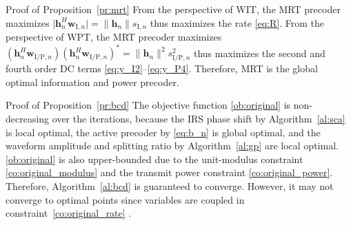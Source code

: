 \documentclass[journal]{IEEEtran}
\begin{document}
\begin{appendix}
		\begin{subsection}{Proof of Proposition~\ref{pr:mrt}}\label{ap:mrt}
			From the perspective of WIT, the MRT precoder maximizes $\lvert{\boldsymbol{h}_{n}^H \boldsymbol{w}_{\mathrm{I}, n}}\rvert = \lVert{\boldsymbol{h}_{n}}\rVert s_{\mathrm{I}, n}$ thus maximizes the rate \eqref{eq:R}. From the perspective of WPT, the MRT precoder maximizes $(\boldsymbol{h}_{n}^H \boldsymbol{w}_{\mathrm{I/P}, n})(\boldsymbol{h}_{n}^H \boldsymbol{w}_{\mathrm{I/P}, n})^* = \lVert{\boldsymbol{h}_{n}}\rVert^2 s_{\mathrm{I/P}, n}^2$ thus maximizes the second and fourth order DC terms \eqref{eq:y_I2}--\eqref{eq:y_P4}. Therefore, MRT is the global optimal information and power precoder.
		\end{subsection}

		\begin{subsection}{Proof of Proposition~\ref{pr:bcd}}\label{ap:bcd}
			The objective function \eqref{ob:original} is non-decreasing over the iterations, because the IRS phase shift by Algorithm~\ref{al:sca} is local optimal, the active precoder by \eqref{eq:b_n} is global optimal, and the waveform amplitude and splitting ratio by Algorithm~\ref{al:gp} are local optimal. \eqref{ob:original} is also upper-bounded due to the unit-modulus constraint \eqref{co:original_modulus} and the transmit power constraint \eqref{co:original_power}. Therefore, Algorithm~\ref{al:bcd} is guaranteed to converge. However, it may not converge to optimal points since variables are coupled in constraint~\eqref{co:original_rate} \cite{Grippo2000}.
		\end{subsection}
	\end{appendix}

	
	
\end{document}
